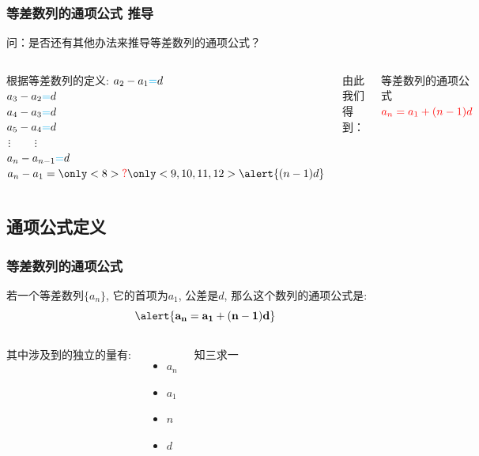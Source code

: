 \documentclass[12pt]{beamer}
\begin{document}
		\begin{frame}\frametitle{等差数列的通项公式 推导}
		    
			问：是否还有其他办法来推导等差数列的通项公式？\pause
			\vspace{10pt}

			\begin{columns}
				根据等差数列的定义: \pause
				$a_2-a_1{\color{cyan}=}d$\\ \pause
				$a_3-a_2{\color{cyan}=}d$\\ \pause
				$a_4-a_3{\color{cyan}=}d$\\ \pause
				$a_5-a_4{\color{cyan}=}d$\\ \pause
				$\hspace{2pt}\vdots \hspace{26pt} \vdots$\\
				$a_n-a_{n-1}{\color{cyan}=}d$\\ \pause
				\vspace{10pt}
				$a_n-a_1=\only<8>{\color{red}?} \only<9,10,11,12>{\alert{(n-1)d}}$ 
				\pause

				\pause

				由此我们得到：
				\begin{block}{等差数列的通项公式}
					${\color{red}a_n=a_1+(n-1)d}$
				\end{block}

			\end{columns}
		\end{frame}


	\subsection{通项公式定义}
		\begin{frame}\frametitle{等差数列的通项公式}
		    
			若一个等差数列$\{a_n\}$, 它的首项为$a_1$, 公差是$d$, 那么这个数列的通项公式是: \pause
			\[ \mathbf{\alert{a_n=a_1+(n-1)d}} \]

			\pause
			\begin{columns}
				\column{0.5\textwidth}
				其中涉及到的独立的量有: \pause
				\begin{itemize}[<+-|alert@+>]
					\item $a_n$
					\item $a_1$
					\item $n$
					\item $d$
				\end{itemize}

				\pause
				\column{0.5\textwidth}
				{\color{magenta} 知三求一}
			\end{columns}
		
		\end{frame}
\end{document}
